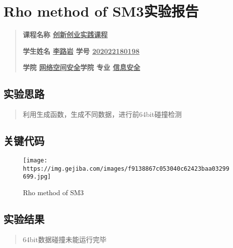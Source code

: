 \documentclass[
]{article}
\author{}
\date{}
\begin{document}
\hypertarget{centerrho-method-of-sm3ux5b9eux9a8cux62a5ux544acenter}{%
\section{Rho method of
SM3实验报告}\label{centerrho-method-of-sm3ux5b9eux9a8cux62a5ux544acenter}}

\begin{quote}
\textbf{课程名称 \uline{创新创业实践课程} }

\textbf{学生姓名 \uline{李路岩} 学号 \uline{202022180198}}

\textbf{学院 \uline{网络空间安全}学院 专业 \uline{信息安全}}
\end{quote}

\tableofcontents

\hypertarget{centerux5b9eux9a8cux601dux8defcenter}{%
\subsection{实验思路}\label{centerux5b9eux9a8cux601dux8defcenter}}

\begin{quote}
利用生成函数，生成不同数据，进行前64bit碰撞检测
\end{quote}

\hypertarget{centerux5173ux952eux4ee3ux7801center}{%
\subsection{关键代码}\label{centerux5173ux952eux4ee3ux7801center}}

\begin{figure}
\centering
\texttt{[image: https://img.gejiba.com/images/f9138867c053040c62423baa03299699.jpg]}
\caption{Rho method of SM3}
\end{figure}

\hypertarget{centerux5b9eux9a8cux7ed3ux679ccenter}{%
\subsection{实验结果}\label{centerux5b9eux9a8cux7ed3ux679ccenter}}

\begin{quote}
64bit数据碰撞未能运行完毕
\end{quote}
\end{document}
